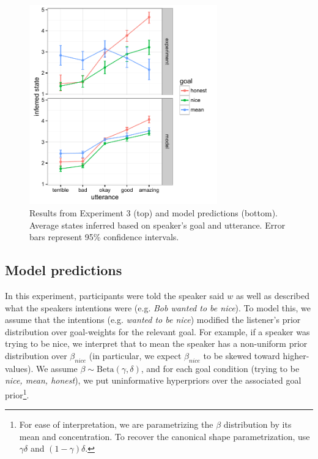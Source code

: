 \documentclass[10pt,letterpaper]{article}
\begin{document}
\begin{figure}
\begin{centering} 
\includegraphics[width=3.2in]{figures/exp3.pdf}
\caption{\label{fig:exp3} Results from Experiment 3 (top) and model predictions (bottom). Average states inferred based on speaker's goal and utterance. Error bars represent 95\% confidence intervals.}
\end{centering} 
\end{figure}




\subsection{Model predictions}

In this experiment, participants were told the speaker said $w$ as well as described what the speakers intentions were (e.g. \emph{Bob wanted to be nice}). 
To model this, we assume that the intentions (e.g. \emph{wanted to be nice}) modified the listener's prior distribution over goal-weights for the relevant goal. For example, if a speaker was trying to be nice, we interpret that to mean the speaker has a non-uniform prior distribution over $\beta_{nice}$ (in particular, we expect $\beta_{nice}$ to be skewed toward higher-values). 
We assume $\beta \sim \text{Beta}(\gamma, \delta)$, and for each goal condition (trying to be \emph{nice, mean, honest}), we put uninformative hyperpriors over the associated goal prior\footnote{For ease of interpretation, we are parametrizing the $\beta$ distribution by its mean and concentration. To recover the canonical shape parametrization, use $\gamma \delta$ and $(1-\gamma)\delta$.}.
\end{document}

